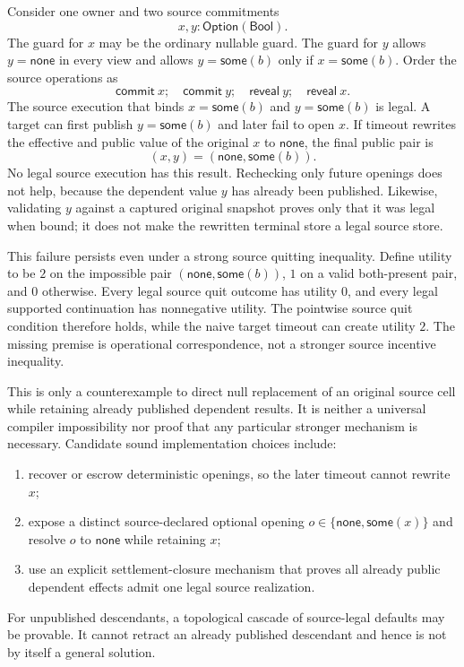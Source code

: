 \documentclass[11pt]{article}
\newcommand{\Some}{\mathsf{some}}
\newcommand{\None}{\mathsf{none}}
\begin{document}
Consider one owner and two source commitments
\[
 x,y : \mathsf{Option}(\mathsf{Bool}).
\]
The guard for $x$ may be the ordinary nullable guard.  The guard for $y$ allows
$y=\None$ in every view and allows $y=\Some(b)$ only if $x=\Some(b)$.  Order the
source operations as
\[
 \mathsf{commit}\ x;\quad \mathsf{commit}\ y;\quad
 \mathsf{reveal}\ y;\quad \mathsf{reveal}\ x.
\]
The source execution that binds $x=\Some(b)$ and $y=\Some(b)$ is legal.  A
target can first publish $y=\Some(b)$ and later fail to open $x$.  If timeout
rewrites the effective and public value of the original $x$ to $\None$, the
final public pair is
\[
 (x,y)=(\None,\Some(b)).
\]
No legal source execution has this result.  Rechecking only future openings
does not help, because the dependent value $y$ has already been published.
Likewise, validating $y$ against a captured original snapshot proves only that
it was legal when bound; it does not make the rewritten terminal store a legal
source store.

This failure persists even under a strong source quitting inequality.  Define
utility to be $2$ on the impossible pair $(\None,\Some(b))$, $1$ on a valid
both-present pair, and $0$ otherwise.  Every legal source quit outcome has
utility $0$, and every legal supported continuation has nonnegative utility.
The pointwise source quit condition therefore holds, while the naive target
timeout can create utility $2$.  The missing premise is operational
correspondence, not a stronger source incentive inequality.

This is only a counterexample to direct null replacement of an original source
cell while retaining already published dependent results.  It is neither a
universal compiler impossibility nor proof that any particular stronger
mechanism is necessary.  Candidate sound implementation choices include:
\begin{enumerate}
\item recover or escrow deterministic openings, so the later timeout cannot
      rewrite $x$;
\item expose a distinct source-declared optional opening $o\in
      \{\None,\Some(x)\}$ and resolve $o$ to $\None$ while retaining $x$;
\item use an explicit settlement-closure mechanism that proves all already
      public dependent effects admit one legal source realization.
\end{enumerate}
For unpublished descendants, a topological cascade of source-legal defaults
may be provable.  It cannot retract an already published descendant and hence
is not by itself a general solution.
\end{document}
